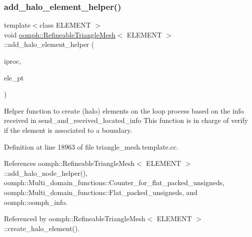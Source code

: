 \subsubsection{\texorpdfstring{add\+\_\+halo\+\_\+element\+\_\+helper()}{add\_halo\_element\_helper()}}
{\footnotesize\ttfamily template$<$class E\+L\+E\+M\+E\+NT $>$ \\
void \hyperlink{classoomph_1_1RefineableTriangleMesh}{oomph\+::\+Refineable\+Triangle\+Mesh}$<$ E\+L\+E\+M\+E\+NT $>$\+::add\+\_\+halo\+\_\+element\+\_\+helper (\begin{DoxyParamCaption}\item[{unsigned \&}]{iproc,  }\item[{\hyperlink{classoomph_1_1FiniteElement}{Finite\+Element} $\ast$}]{ele\+\_\+pt }\end{DoxyParamCaption})\hspace{0.3cm}{\ttfamily [protected]}}



Helper function to create (halo) elements on the loop process based on the info received in send\+\_\+and\+\_\+received\+\_\+located\+\_\+info This function is in charge of verify if the element is associated to a boundary. 



Definition at line 18963 of file triangle\+\_\+mesh.\+template.\+cc.



References oomph\+::\+Refineable\+Triangle\+Mesh$<$ E\+L\+E\+M\+E\+N\+T $>$\+::add\+\_\+halo\+\_\+node\+\_\+helper(), oomph\+::\+Multi\+\_\+domain\+\_\+functions\+::\+Counter\+\_\+for\+\_\+flat\+\_\+packed\+\_\+unsigneds, oomph\+::\+Multi\+\_\+domain\+\_\+functions\+::\+Flat\+\_\+packed\+\_\+unsigneds, and oomph\+::oomph\+\_\+info.



Referenced by oomph\+::\+Refineable\+Triangle\+Mesh$<$ E\+L\+E\+M\+E\+N\+T $>$\+::create\+\_\+halo\+\_\+element().

\mbox{\label{classoomph_1_1RefineableTriangleMesh_a1ea169baf7b9d85c2f3334ea5dd3199a}} 
